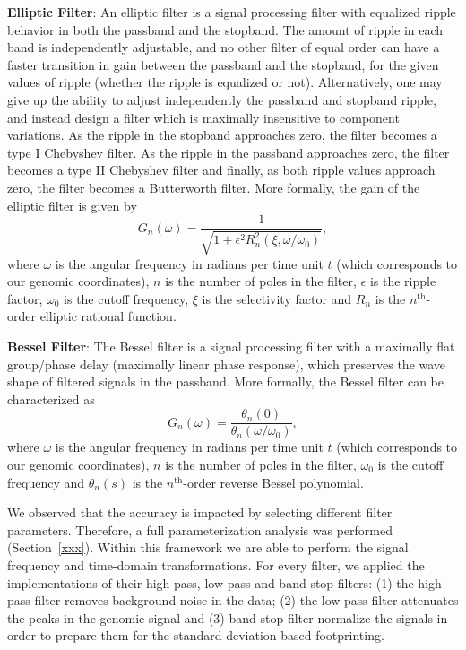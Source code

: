 \textbf{Elliptic Filter}: An elliptic filter is a signal processing filter with equalized ripple behavior in both the passband and the stopband. The amount of ripple in each band is independently adjustable, and no other filter of equal order can have a faster transition in gain between the passband and the stopband, for the given values of ripple (whether the ripple is equalized or not). Alternatively, one may give up the ability to adjust independently the passband and stopband ripple, and instead design a filter which is maximally insensitive to component variations. As the ripple in the stopband approaches zero, the filter becomes a type I Chebyshev filter. As the ripple in the passband approaches zero, the filter becomes a type II Chebyshev filter and finally, as both ripple values approach zero, the filter becomes a Butterworth filter. More formally, the gain of the elliptic filter is given by
\begin{equation}
  \label{eq:elliptic1}
  G_n(\omega)=\frac{1}{\sqrt{1+{ \epsilon^2 R_n^2(\xi,\omega/\omega_0)}}},
\end{equation}
where $ \omega $ is the angular frequency in radians per time unit $ t $ (which corresponds to our genomic coordinates), $n$ is the number of poles in the filter, $ \epsilon $ is the ripple factor, $ \omega_0 $ is the cutoff frequency, $ \xi $ is the selectivity factor and $ R_n $ is the $n^{\text{th}}$-order elliptic rational function.

\textbf{Bessel Filter}: The Bessel filter is a signal processing filter with a maximally flat group/phase delay (maximally linear phase response), which preserves the wave shape of filtered signals in the passband. More formally, the Bessel filter can be characterized as
\begin{equation}
  \label{eq:bessel1}
  G_n(\omega) = \frac{\theta_n(0)}{\theta_n(\omega/\omega_0)},
\end{equation}
where $ \omega $ is the angular frequency in radians per time unit $ t $ (which corresponds to our genomic coordinates), $n$ is the number of poles in the filter, $ \omega_0 $ is the cutoff frequency and $ \theta_n(s) $ is the $n^{\text{th}}$-order reverse Bessel polynomial.

We observed that the accuracy is impacted by selecting different filter parameters. Therefore, a full parameterization analysis was performed (Section~\ref{xxx}). Within this framework we are able to perform the signal frequency and time-domain transformations. For every filter, we applied the implementations of their high-pass, low-pass and band-stop filters: (1) the high-pass filter removes background noise in the data; (2) the low-pass filter attenuates the peaks in the genomic signal and (3) band-stop filter normalize the signals in order to prepare them for the standard deviation-based footprinting.

